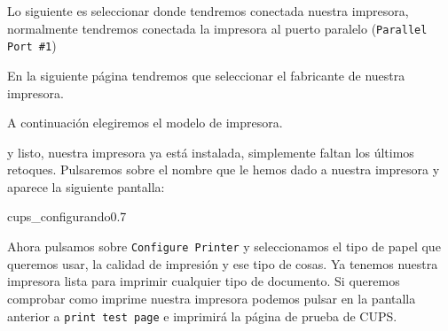 
Lo  siguiente   es  seleccionar  donde  tendremos   conectada  nuestra
impresora,  normalmente tendremos  conectada  la  impresora al  puerto
paralelo ({\tt Parallel Port \#1})


En  la siguiente  página tendremos  que seleccionar  el fabricante  de
nuestra impresora.


A continuación elegiremos el modelo de impresora.


y listo, nuestra  impresora ya está instalada,  simplemente faltan los
últimos  retoques. Pulsaremos  sobre el  nombre  que le  hemos dado  a
nuestra impresora y aparece la siguiente pantalla:

\begin{figura}{cups_configurando}{0.7}
\caption{Configuración de CUPS}
\end{figura}

Ahora pulsamos sobre  {\tt Configure Printer} y  seleccionamos el tipo
de papel  que queremos  usar, la  calidad de impresión  y ese  tipo de
cosas. Ya tenemos nuestra impresora lista para imprimir cualquier tipo
de  documento. Si  queremos comprobar  como imprime  nuestra impresora
podemos  pulsar en  la pantalla  anterior a  {\tt print  test page}  e
imprimirá la página de prueba de CUPS.

